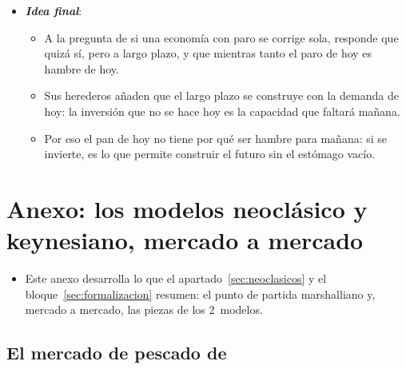 \documentclass[11pt]{article}
\begin{document}
\begin{itemize}
\begin{itemize}
  \item La macroeconomía de hoy la responde con modelos que él no habría escrito, pero la respuesta práctica de 2020 fue la suya\nocite{CE2026NGEU}.
  \end{itemize}
\item \textbf{\emph{Idea final}}:
  \begin{itemize}
  \item A la pregunta de si una economía con paro se corrige sola,  responde que quizá sí, pero a largo plazo, y que mientras tanto el paro de hoy es hambre de hoy.
  \item Sus herederos añaden que el largo plazo se construye con la demanda de hoy: la inversión que no se hace hoy es la capacidad que faltará mañana.
  \item Por eso el pan de hoy no tiene por qué ser hambre para mañana: si se invierte, es lo que permite construir el futuro sin el estómago vacío.
  \end{itemize}
\end{itemize}

\clearpage
\appendix

\section{Anexo: los modelos neoclásico y keynesiano,\cortetitulo{} mercado a mercado}\label{anexo:modelos}

\begin{itemize}
\item Este anexo desarrolla lo que el apartado~\ref{sec:neoclasicos} y el bloque~\ref{sec:formalizacion} resumen: el punto de partida marshalliano y, mercado a mercado, las piezas de los 2~modelos.
\end{itemize}

\subsection{El mercado de pescado de }\label{anexo:marshall}
\end{document}
